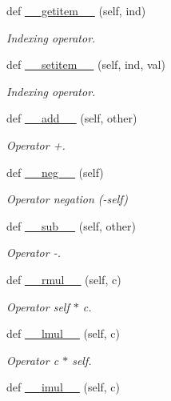 \begin{DoxyCompactItemize}
def \hyperlink{classgeometry_1_1Point_a68cd5b720a72a8c546c2b11b60d2dd76}{\+\_\+\+\_\+getitem\+\_\+\+\_\+} (self, ind)
\begin{DoxyCompactList}\small\item\em Indexing operator. \end{DoxyCompactList}\item 
def \hyperlink{classgeometry_1_1Point_aae8560cc5718faf25f3cb70942a32395}{\+\_\+\+\_\+setitem\+\_\+\+\_\+} (self, ind, val)
\begin{DoxyCompactList}\small\item\em Indexing operator. \end{DoxyCompactList}\item 
def \hyperlink{classgeometry_1_1Point_a9ada2b2ca2dbc3dc42665fd218bc4244}{\+\_\+\+\_\+add\+\_\+\+\_\+} (self, other)
\begin{DoxyCompactList}\small\item\em Operator +. \end{DoxyCompactList}\item 
def \hyperlink{classgeometry_1_1Point_a141cda9317590cdc109610b17a07249f}{\+\_\+\+\_\+neg\+\_\+\+\_\+} (self)
\begin{DoxyCompactList}\small\item\em Operator negation (-\/self) \end{DoxyCompactList}\item 
def \hyperlink{classgeometry_1_1Point_ae2be6f6c6a6d6a43355225ab26533dad}{\+\_\+\+\_\+sub\+\_\+\+\_\+} (self, other)
\begin{DoxyCompactList}\small\item\em Operator -\/. \end{DoxyCompactList}\item 
def \hyperlink{classgeometry_1_1Point_a2bc744353849f1680e960ee5092d1ac4}{\+\_\+\+\_\+rmul\+\_\+\+\_\+} (self, c)
\begin{DoxyCompactList}\small\item\em Operator self $\ast$ c. \end{DoxyCompactList}\item 
def \hyperlink{classgeometry_1_1Point_a6e7eb112430d791c348f970ee0b133cc}{\+\_\+\+\_\+lmul\+\_\+\+\_\+} (self, c)
\begin{DoxyCompactList}\small\item\em Operator c $\ast$ self. \end{DoxyCompactList}\item 
def \hyperlink{classgeometry_1_1Point_a07650758ee8b4493ac73042817e98aa5}{\+\_\+\+\_\+imul\+\_\+\+\_\+} (self, c)

\end{DoxyCompactItemize}
